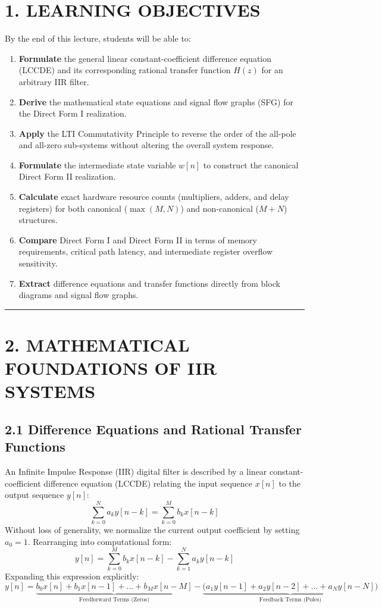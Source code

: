 \documentclass[11pt,a4paper]{article}
\begin{document}
\section{1. LEARNING OBJECTIVES}
By the end of this lecture, students will be able to:
\begin{enumerate}
    \item \textbf{Formulate} the general linear constant-coefficient difference equation (LCCDE) and its corresponding rational transfer function $H(z)$ for an arbitrary IIR filter.
    \item \textbf{Derive} the mathematical state equations and signal flow graphs (SFG) for the Direct Form I realization.
    \item \textbf{Apply} the LTI Commutativity Principle to reverse the order of the all-pole and all-zero sub-systems without altering the overall system response.
    \item \textbf{Formulate} the intermediate state variable $w[n]$ to construct the canonical Direct Form II realization.
    \item \textbf{Calculate} exact hardware resource counts (multipliers, adders, and delay registers) for both canonical ($\max(M, N)$) and non-canonical ($M+N$) structures.
    \item \textbf{Compare} Direct Form I and Direct Form II in terms of memory requirements, critical path latency, and intermediate register overflow sensitivity.
    \item \textbf{Extract} difference equations and transfer functions directly from block diagrams and signal flow graphs.
\end{enumerate}

\noindent\rule{\textwidth}{0.5pt}

\section{2. MATHEMATICAL FOUNDATIONS OF IIR SYSTEMS}

\subsection{2.1 Difference Equations and Rational Transfer Functions}
An Infinite Impulse Response (IIR) digital filter is described by a linear constant-coefficient difference equation (LCCDE) relating the input sequence $x[n]$ to the output sequence $y[n]$:
\begin{equation}
\sum_{k=0}^{N} a_k y[n-k] = \sum_{k=0}^{M} b_k x[n-k]
\end{equation}
Without loss of generality, we normalize the current output coefficient by setting $a_0 = 1$. Rearranging into computational form:
\begin{equation}
y[n] = \sum_{k=0}^{M} b_k x[n-k] - \sum_{k=1}^{N} a_k y[n-k]
\label{eq:iir_diff_eq}
\end{equation}
Expanding this expression explicitly:
\begin{equation}
y[n] = \underbrace{b_0 x[n] + b_1 x[n-1] + \dots + b_M x[n-M]}_{\text{Feedforward Terms (Zeros)}} - \underbrace{\Big( a_1 y[n-1] + a_2 y[n-2] + \dots + a_N y[n-N] \Big)}_{\text{Feedback Terms (Poles)}}
\end{equation}
\end{document}
